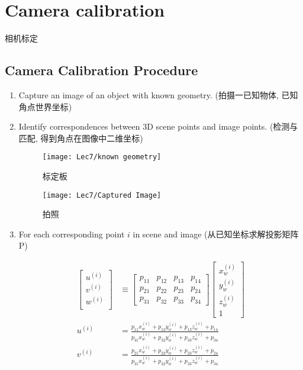 \section{Camera calibration}
相机标定
\subsection{Camera Calibration Procedure}
\begin{enumerate}
    \item Capture an image of an object with known geometry. (拍摄一已知物体, 已知角点世界坐标)
    \item Identify correspondences between 3D scene points and image points. (检测与匹配, 得到角点在图像中二维坐标) 
    \begin{figure}[H]
        \centering
        \begin{minipage}{0.38\textwidth}
            \centering
            \texttt{[image: Lec7/known geometry]}
            \caption{标定板}
        \end{minipage}
        \begin{minipage}{0.38\textwidth}
            \centering
            \texttt{[image: Lec7/Captured Image]}
            \caption{拍照}
        \end{minipage}
    \end{figure}
    \item For each corresponding point $i$ in scene and image (从已知坐标求解投影矩阵P)
    
    \begin{align*}
        \begin{bmatrix}
            u^{(i)}\\
            v^{(i)}\\
            w^{(i)}\\
        \end{bmatrix}&\equiv\begin{bmatrix}
            p_{11} & p_{12} & p_{13} & p_{14} \\
            p_{21} & p_{22} & p_{23} & p_{24} \\
            p_{31} & p_{32} & p_{33} & p_{34}
        \end{bmatrix}\begin{bmatrix}
            x_w^{(i)}\\y_w^{(i)}\\z_w^{(i)}\\1
        \end{bmatrix}\\
        u^{(i)}&=\frac{p_{11} x_{w}^{(i)}+p_{12} y_{w}^{(i)}+p_{13} z_{w}^{(i)}+p_{14}}{p_{31} x_{w}^{(i)}+p_{32} y_{w}^{(i)}+p_{33} z_{w}^{(i)}+p_{34}} \\
        v^{(i)}&=\frac{p_{21} x_{w}^{(i)}+p_{22} y_{w}^{(i)}+p_{23} z_{w}^{(i)}+p_{24}}{p_{31} x_{w}^{(i)}+p_{32} y_{w}^{(i)}+p_{33} z_{w}^{(i)}+p_{34}}
    \end{align*}


\end{enumerate}
